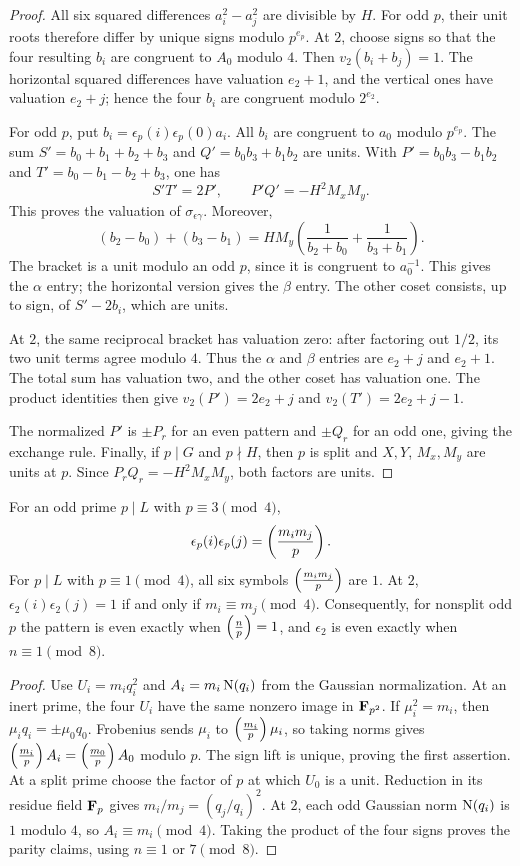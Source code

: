 \begin{proof}
All six squared differences $a_i^2-a_j^2$ are divisible by $H$.
For odd $p$, their unit roots therefore differ by unique signs
modulo $p^{e_p}$.  At $2$, choose signs so that the four resulting
$b_i$ are congruent to $A_0$ modulo $4$.  Then $v_2(b_i+b_j)=1$.
The horizontal squared differences have valuation $e_2+1$,
and the vertical ones have valuation $e_2+j$; hence the four
$b_i$ are congruent modulo $2^{e_2}$.

For odd $p$, put $b_i=\epsilon_p(i)\epsilon_p(0)a_i$.
All $b_i$ are congruent to $a_0$ modulo $p^{e_p}$.
The sum $S'=b_0+b_1+b_2+b_3$ and
$Q'=b_0b_3+b_1b_2$ are units.  With
$P'=b_0b_3-b_1b_2$ and $T'=b_0-b_1-b_2+b_3$, one has
\[
 S'T'=2P',\qquad P'Q'=-H^2M_xM_y.
\]
This proves the valuation of $\sigma_{\epsilon\gamma}$.
Moreover,
\[
 (b_2-b_0)+(b_3-b_1)
 =H M_y\left(\frac1{b_2+b_0}+\frac1{b_3+b_1}\right).
\]
The bracket is a unit modulo an odd $p$, since it is congruent
to $a_0^{-1}$.  This gives the $\alpha$ entry; the horizontal
version gives the $\beta$ entry.  The other coset consists,
up to sign, of $S'-2b_i$, which are units.

At $2$, the same reciprocal bracket has valuation zero: after
factoring out $1/2$, its two unit terms agree modulo $4$.
Thus the $\alpha$ and $\beta$ entries are $e_2+j$ and
$e_2+1$.  The total sum has valuation two, and the other coset
has valuation one.  The product identities then give
$v_2(P')=2e_2+j$ and $v_2(T')=2e_2+j-1$.

The normalized $P'$ is $\pm P_r$ for an even pattern and
$\pm Q_r$ for an odd one, giving the exchange rule.  Finally,
if $p\mid G$ and $p\nmid H$, then $p$ is split and $X,Y$,
$M_x,M_y$ are units at $p$.  Since
$P_rQ_r=-H^2M_xM_y$, both factors are units.
\end{proof}

\begin{proposition}
\label{prop:pat-colours}
For an odd prime $p\mid L$ with $p\equiv3\pmod4$,
\[
 \epsilon_p(i)\epsilon_p(j)=\left(\frac{m_im_j}{p}\right).
\]
For $p\mid L$ with $p\equiv1\pmod4$, all six symbols
$\left(\frac{m_im_j}{p}\right)$ are $1$.  At $2$,
$\epsilon_2(i)\epsilon_2(j)=1$ if and only if
$m_i\equiv m_j\pmod4$.  Consequently, for nonsplit odd $p$
the pattern is even exactly when $\left(\frac{n}{p}\right)=1$, and
$\epsilon_2$ is even exactly when $n\equiv1\pmod8$.
\end{proposition}

\begin{proof}
Use $U_i=m_iq_i^2$ and $A_i=m_i\operatorname{N}(q_i)$ from the Gaussian
normalization.  At an inert prime, the four $U_i$ have the same
nonzero image in $\mathbf F_{p^2}$.  If $\mu_i^2=m_i$, then
$\mu_iq_i=\pm\mu_0q_0$.  Frobenius sends
$\mu_i$ to $\left(\frac{m_i}{p}\right)\mu_i$, so taking norms gives
$\left(\frac{m_i}{p}\right)A_i=\left(\frac{m_0}{p}\right)A_0$ modulo $p$.
The sign lift is unique, proving the first assertion.
At a split prime choose the factor of $p$ at which $U_0$ is a
unit.  Reduction in its residue field $\mathbf F_p$ gives
$m_i/m_j=(q_j/q_i)^2$.
At $2$, each odd Gaussian norm $\operatorname{N}(q_i)$ is $1$ modulo $4$,
so $A_i\equiv m_i\pmod4$.
Taking the product of the four signs proves the parity claims,
using $n\equiv1$ or $7\pmod8$.
\end{proof}

